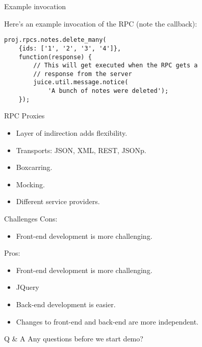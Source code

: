 \documentclass{beamer}
\begin{document}
\begin{frame}[fragile]{Example invocation}

Here's an example invocation of the RPC (note the callback):
\begin{verbatim}
proj.rpcs.notes.delete_many(
    {ids: ['1', '2', '3', '4']},
    function(response) {
        // This will get executed when the RPC gets a
        // response from the server
        juice.util.message.notice(
            'A bunch of notes were deleted');
    });
\end{verbatim}
\end{frame}

\begin{frame}{RPC Proxies}
  \begin{itemize}
  \item Layer of indirection adds flexibility.
  \item Transports: JSON, XML, REST, JSONp.
  \item Boxcarring.
  \item Mocking.
  \item Different service providers.
  \end{itemize}
\end{frame}

\begin{frame}{Challenges}
  Cons:
  \begin{itemize}
    \item Front-end development is more challenging.
  \end{itemize}
  Pros:
  \begin{itemize}
    \item Front-end development is more challenging.
    \item JQuery
    \item Back-end development is easier.
    \item Changes to front-end and back-end are more independent.
  \end{itemize}
\end{frame}

\begin{frame}{Q \& A}
  Any questions before we start demo?
\end{frame}
\end{document}
